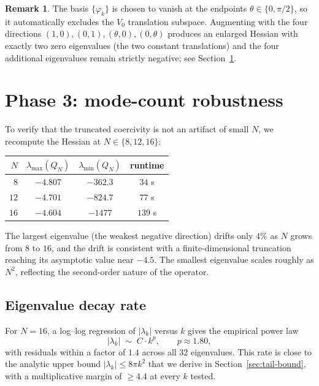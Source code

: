 \documentclass[11pt]{amsart}
\theoremstyle{plain}
\theoremstyle{definition}
\newtheorem{remark}[theorem]{Remark}
\begin{document}
\begin{remark}
The basis $\{\varphi_{k}\}$ is chosen to vanish at the endpoints
$\theta \in \{0, \pi/2\}$, so it automatically excludes the
$V_{0}$ translation subspace.  Augmenting with the four directions
$(1, 0), (0, 1), (\theta, 0), (0, \theta)$ produces an enlarged
Hessian with exactly two zero eigenvalues (the two constant
translations) and the four additional eigenvalues remain strictly
negative; see Section~\ref{sec:phase3}.
\end{remark}

\section{Phase 3: mode-count robustness}\label{sec:phase3}

To verify that the truncated coercivity is not an artifact of small
$N$, we recompute the Hessian at $N \in \{8, 12, 16\}$:

\begin{center}
\begin{tabular}{rccc}
\toprule
$N$ & $\lambda_{\max}(Q_{N})$ & $\lambda_{\min}(Q_{N})$ & runtime \\
\midrule
$8$  & $-4.807$ & $-362.3$  & $34$ s \\
$12$ & $-4.701$ & $-824.7$  & $77$ s \\
$16$ & $-4.604$ & $-1477$ & $139$ s \\
\bottomrule
\end{tabular}
\end{center}

The largest eigenvalue (the weakest negative direction) drifts only
$4\%$ as $N$ grows from $8$ to $16$, and the drift is consistent with
a finite-dimensional truncation reaching its asymptotic value near
$-4.5$.  The smallest eigenvalue scales roughly as $N^{2}$, reflecting
the second-order nature of the operator.

\subsection{Eigenvalue decay rate}

For $N = 16$, a log--log regression of $|\lambda_{k}|$ versus $k$
gives the empirical power law
\begin{equation}\label{eq:decay}
  |\lambda_{k}| \;\sim\; C \cdot k^{p}, \qquad p \approx 1.80,
\end{equation}
with residuals within a factor of $1.4$ across all $32$
eigenvalues.  This rate is close to the analytic upper bound
$|\lambda_{k}| \leq 8\pi k^{2}$ that we derive in
Section~\ref{sec:tail-bound}, with a multiplicative margin of $\geq
4.4$ at every $k$ tested.
\end{document}
